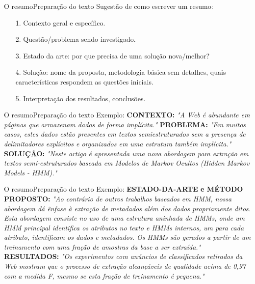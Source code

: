 \documentclass[t]{beamer}
\begin{document}

\begin{ftst}{O resumo}{Preparação do texto}
\justifying
Sugestão de como escrever um resumo:
\vone
\begin{itemize}
    \item[1. ] Contexto geral e específico.
    \item[2. ] Questão/problema sendo investigado.
    \item[3. ] Estado da arte: por que precisa de uma solução nova/melhor?
    \item[4. ] Solução: nome da proposta, metodologia básica sem detalhes, quais características respondem as questões iniciais.
    \item[5. ] Interpretação dos resultados, conclusões.
\end{itemize}


\end{ftst}


\begin{ftst}{O resumo}{Preparação do texto}
\justifying
Exemplo:
\vone
\small
\textbf{CONTEXTO:} \textit{"A Web é abundante em páginas que armazenam dados de forma implícita."}
\vone
\textbf{PROBLEMA:} \textit{"Em muitos casos, estes dados estão presentes em textos semiestruturados sem a presença de delimitadores explícitos e organizados em uma estrutura também implícita."}
\vone
\textbf{SOLUÇÃO:} \textit{"Neste artigo é apresentada uma nova abordagem para extração em textos semi-estruturados baseada em Modelos de Markov Ocultos (Hidden Markov Models - HMM)."}



\end{ftst}


\begin{ftst}{O resumo}{Preparação do texto}
\justifying
Exemplo:
\vone
\small
\textbf{ESTADO-DA-ARTE e MÉTODO PROPOSTO:} \textit{"Ao contrário de outros trabalhos baseados em HMM, nossa abordagem dá ênfase à extração de metadados além dos dados propriamente ditos. Esta abordagem consiste no uso de uma estrutura aninhada de HMMs, onde um HMM principal identifica os atributos no texto e HMMs internos, um para cada atributo, identificam os dados e metadados. Os HMMs são gerados a partir de um treinamento com uma fração de amostras da base a ser extraída."}
\vone
\textbf{RESULTADOS:} \textit{"Os experimentos com anúncios de
classificados retirados da Web mostram que o processo de
extração alcançáveis de qualidade acima de 0,97 com a medida F,
mesmo se esta fração de treinamento é pequena."}

\end{ftst}
\end{document}
